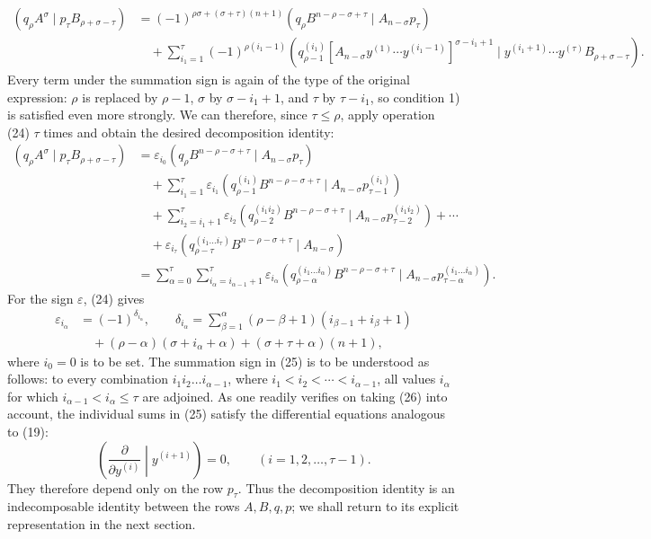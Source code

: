 \documentclass[10pt]{article}
\newcommand{\pair}[2]{(#1\mid #2)}
\newcommand{\eps}{\varepsilon}
\begin{document}
\begin{equation}
\begin{aligned}
\pair{q_\rho A^\sigma}{p_\tau B_{\rho+\sigma-\tau}}
&=(-1)^{\rho\sigma+(\sigma+\tau)(n+1)}
  \pair{q_\rho B^{n-\rho-\sigma+\tau}}{A_{n-\sigma}p_\tau}\\
&\quad+\sum_{i_1=1}^{\tau}(-1)^{\rho(i_1-1)}
 \pair{q_{\rho-1}^{(i_1)}[A_{n-\sigma}y^{(1)}\cdots y^{(i_1-1)}]^{\sigma-i_1+1}}
 {y^{(i_1+1)}\cdots y^{(\tau)}B_{\rho+\sigma-\tau}}.
\end{aligned}
\tag{24}
\end{equation}
Every term under the summation sign is again of the type of the original expression: $\rho$ is replaced by $\rho-1$, $\sigma$ by $\sigma-i_1+1$, and $\tau$ by $\tau-i_1$, so condition 1) is satisfied even more strongly. We can therefore, since $\tau\le\rho$, apply operation (24) $\tau$ times and obtain the desired decomposition identity:
\begin{equation}
\begin{aligned}
\pair{q_\rho A^\sigma}{p_\tau B_{\rho+\sigma-\tau}}
&=\eps_{i_0}\pair{q_\rho B^{n-\rho-\sigma+\tau}}{A_{n-\sigma}p_\tau}\\
&\quad+\sum_{i_1=1}^{\tau}\eps_{i_1}
 \pair{q_{\rho-1}^{(i_1)}B^{n-\rho-\sigma+\tau}}{A_{n-\sigma}p_{\tau-1}^{(i_1)}}\\
&\quad+\sum_{i_2=i_1+1}^{\tau}\eps_{i_2}
 \pair{q_{\rho-2}^{(i_1i_2)}B^{n-\rho-\sigma+\tau}}{A_{n-\sigma}p_{\tau-2}^{(i_1i_2)}}+\cdots\\
&\quad+\eps_{i_\tau}\pair{q_{\rho-\tau}^{(i_1\ldots i_\tau)}B^{n-\rho-\sigma+\tau}}{A_{n-\sigma}}\\
&=\sum_{\alpha=0}^{\tau}\sum_{i_\alpha=i_{\alpha-1}+1}^{\tau}\eps_{i_\alpha}
 \pair{q_{\rho-\alpha}^{(i_1\ldots i_\alpha)}B^{n-\rho-\sigma+\tau}}{A_{n-\sigma}p_{\tau-\alpha}^{(i_1\ldots i_\alpha)}}.
\end{aligned}
\tag{25}
\end{equation}
For the sign $\eps$, (24) gives
\begin{equation}
\begin{aligned}
\eps_{i_\alpha}&=(-1)^{\delta_{i_\alpha}},\qquad
\delta_{i_\alpha}=\sum_{\beta=1}^{\alpha}(\rho-\beta+1)(i_{\beta-1}+i_\beta+1)\\
&\quad +(\rho-\alpha)(\sigma+i_\alpha+\alpha)+(\sigma+\tau+\alpha)(n+1),
\end{aligned}
\tag{26}
\end{equation}
where $i_0=0$ is to be set. The summation sign in (25) is to be understood as follows: to every combination $i_1i_2\ldots i_{\alpha-1}$, where $i_1<i_2<\cdots<i_{\alpha-1}$, all values $i_\alpha$ for which $i_{\alpha-1}<i_\alpha\le\tau$ are adjoined. As one readily verifies on taking (26) into account, the individual sums in (25) satisfy the differential equations analogous to (19):
\begin{equation}
 \left(\frac{\partial}{\partial y^{(i)}}\middle|y^{(i+1)}\right)=0,
 \qquad (i=1,2,\ldots,\tau-1).
\tag{27}
\end{equation}
They therefore depend only on the row $p_\tau$. Thus the decomposition identity is an indecomposable identity between the rows $A,B,q,p$; we shall return to its explicit representation in the next section.
\end{document}
